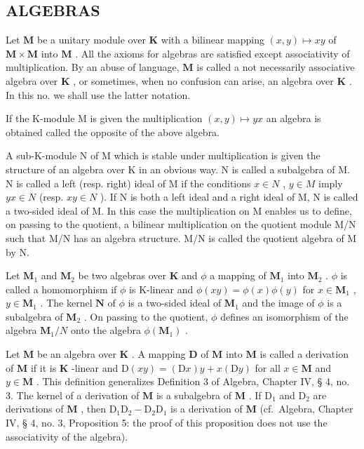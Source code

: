 \subsection{ALGEBRAS}

Let \(\mathbf{M}\) be a unitary module over \(\mathbf{K}\) with a bilinear mapping \((x,y)\mapsto xy\) of \(\mathbf{M}\times \mathbf{M}\) into \(\mathbf{M}\) . All the axioms for algebras are satisfied except associativity of multiplication. By an abuse of language, \(\mathbf{M}\) is called a not necessarily associative algebra over \(\mathbf{K}\) , or sometimes, when no confusion can arise, an algebra over \(\mathbf{K}\) . In this no. we shall use the latter notation.

If the K-module M is given the multiplication \((x,y)\mapsto yx\) an algebra is obtained called the opposite of the above algebra.

A sub-K-module N of M which is stable under multiplication is given the structure of an algebra over K in an obvious way. N is called a subalgebra of M. N is called a left (resp. right) ideal of M if the conditions \(x \in N\) , \(y \in M\) imply \(yx \in N\) (resp. \(xy \in N\) ). If N is both a left ideal and a right ideal of M, N is called a two-sided ideal of M. In this case the multiplication on M enables us to define, on passing to the quotient, a bilinear multiplication on the quotient module M/N such that M/N has an algebra structure. M/N is called the quotient algebra of M by N.

Let \(\mathbf{M}_1\) and \(\mathbf{M}_2\) be two algebras over \(\mathbf{K}\) and \(\phi\) a mapping of \(\mathbf{M}_1\) into \(\mathbf{M}_2\) . \(\phi\) is called a homomorphism if \(\phi\) is K-linear and \(\phi(xy) = \phi(x)\phi(y)\) for \(x\in \mathbf{M}_1\) , \(y\in \mathbf{M}_1\) . The kernel \(\mathbf{N}\) of \(\phi\) is a two-sided ideal of \(\mathbf{M}_1\) and the image of \(\phi\) is a subalgebra of \(\mathbf{M}_2\) . On passing to the quotient, \(\phi\) defines an isomorphism of the algebra \(\mathbf{M}_1 / N\) onto the algebra \(\phi (\mathbf{M}_1)\) .

Let \(\mathbf{M}\) be an algebra over \(\mathbf{K}\) . A mapping \(\mathbf{D}\) of \(\mathbf{M}\) into \(\mathbf{M}\) is called a derivation of \(\mathbf{M}\) if it is \(\mathbf{K}\) -linear and \(\mathrm{D}(xy) = (\mathrm{D}x)y + x(\mathrm{D}y)\) for all \(x \in \mathbf{M}\) and \(y \in \mathbf{M}\) . This definition generalizes Definition 3 of Algebra, Chapter IV, § 4, no. 3. The kernel of a derivation of \(\mathbf{M}\) is a subalgebra of \(\mathbf{M}\) . If \(\mathrm{D}_1\) and \(\mathrm{D}_2\) are derivations of \(\mathbf{M}\) , then \(\mathrm{D}_1\mathrm{D}_2 - \mathrm{D}_2\mathrm{D}_1\) is a derivation of \(\mathbf{M}\) (cf.~Algebra, Chapter IV, § 4, no. 3, Proposition 5: the proof of this proposition does not use the associativity of the algebra).

